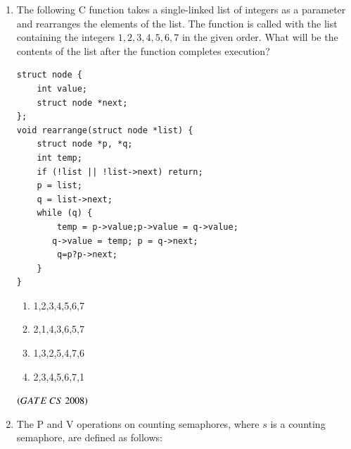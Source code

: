 \documentclass[journal, onecolumn]{IEEEtran}
\numberwithin{equation}{enumi}
\numberwithin{figure}{enumi}
\begin{document}
\begin{enumerate}
\begin{verbatim}
int main() {
    printf("Enter Text"); printf("\n");
    reverse(); printf("\n");
}
\end{verbatim}

\begin{enumerate}
\item \texttt{?1: (getchar() != '\textbackslash n')} \\
      \texttt{?2: getchar(c);}
\item \texttt{?1: (c = getchar()) != '\textbackslash n'} \\
      \texttt{?2: getchar(c);}
\item \texttt{?1: (c != '\textbackslash n')} \\
      \texttt{?2: putchar(c);}
\item \texttt{?1: ((c = getchar()) != '\textbackslash n')} \\
      \texttt{?2: putchar(c);}
\end{enumerate}
\hfill $\brak{GATE\ CS\  2008}$
\bigskip

\item The following C function takes a single-linked list of integers as a parameter and rearranges the elements of the list. 
The function is called with the list containing the integers $1,2,3,4,5,6,7$ in the given order. 
What will be the contents of the list after the function completes execution?

\begin{verbatim}
struct node {
    int value;
    struct node *next;
};
void rearrange(struct node *list) {
    struct node *p, *q;
    int temp;
    if (!list || !list->next) return;
    p = list; 
    q = list->next;
    while (q) {
        temp = p->value;p->value = q->value; 
       q->value = temp; p = q->next;
        q=p?p->next;    
    }
}
\end{verbatim}
\vspace{-1em}%
\begin{multicols}{4}
\begin{enumerate}
   \item 1,2,3,4,5,6,7
   \item 2,1,4,3,6,5,7
   \item 1,3,2,5,4,7,6
   \item 2,3,4,5,6,7,1
\end{enumerate}
\end{multicols}
\hfill $\brak{GATE\ CS\  2008}$

\item The P and V operations on counting semaphores, where $s$ is a counting semaphore, are defined as follows:


\end{enumerate}
\end{document}
